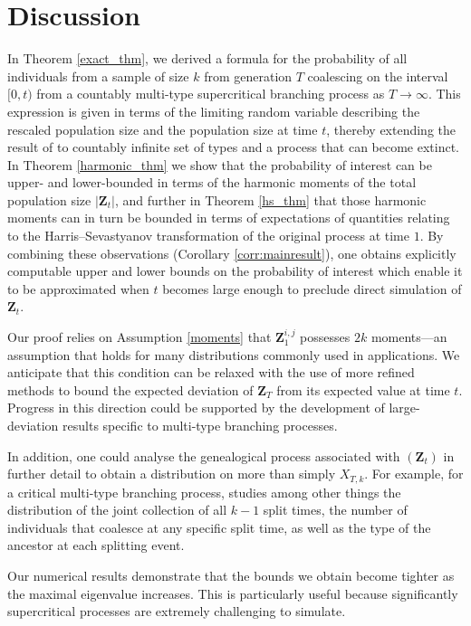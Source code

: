 \documentclass[preprint,3p,12pt]{elsarticle}
\theoremstyle{definition}
\begin{document}
\section{Discussion} \label{sec:discussion}
In Theorem \ref{exact_thm}, we derived a formula for the probability of all individuals from a sample of size $k$ from generation $T$ coalescing on the interval $[0, t)$ from a countably multi-type supercritical branching process as $T \rightarrow \infty$. This expression is given in terms of the limiting random variable describing the rescaled population size and the population size at time $t$, thereby extending the result of \cite{Hong2015} to countably infinite set of types and a process that can become extinct. In Theorem \ref{harmonic_thm} we show that the probability of interest can be upper- and lower-bounded in terms of the harmonic moments of the total population size $|\boldsymbol{Z}_t|$, and further in Theorem \ref{hs_thm} that those harmonic moments can in turn be bounded in terms of expectations of quantities relating to the Harris--Sevastyanov transformation of the original process at time $1$.  By combining these observations (Corollary \ref{corr:mainresult}), one obtains explicitly computable upper and lower bounds on the probability of interest which enable it to be approximated when $t$ becomes large enough to preclude direct simulation of $\boldsymbol{Z}_t$.

Our proof relies on Assumption \ref{moments} that $\boldsymbol{Z}_1^{i,j}$ possesses $2k$ moments---an assumption that holds for many distributions commonly used in applications. We anticipate that this condition can be relaxed with the use of more refined methods to bound the expected deviation of $\boldsymbol{Z}_T$ from its expected value at time $t$. Progress in this direction could be supported by the development of large-deviation results specific to multi-type branching processes.

In addition, one could analyse the genealogical process associated with $(\boldsymbol{Z}_t)$ in further detail to obtain a distribution on more than simply $X_{T,k}$. For example, for a critical multi-type branching process, \cite{osvaldo} studies among other things the distribution of the joint collection of all $k-1$ split times, the number of individuals that coalesce at any specific split time, as well as the type of the ancestor at each splitting event.

Our numerical results demonstrate that the bounds we obtain become tighter as the maximal eigenvalue increases. This is particularly useful because significantly supercritical processes are extremely challenging to simulate.
\end{document}
